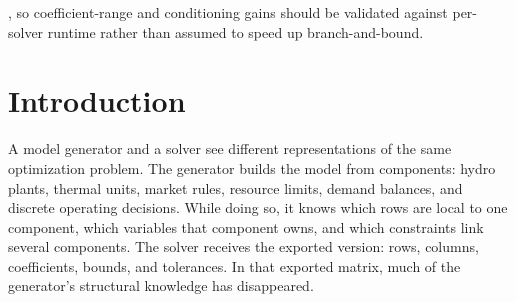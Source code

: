 \documentclass[AMA,Times1COL]{WileyNJDv5} %
\providecommand{\DIFadd}[1]{{\protect\color{blue} \sf #1}} %
\providecommand{\DIFaddbegin}{} %
\providecommand{\DIFaddend}{} %
\providecommand{\DIFdelend}{} %
\begin{document}
\begin{itemize}
\DIFdelend \DIFaddbegin \DIFadd{, so coefficient-range and conditioning gains
  should be validated against per-solver runtime rather than assumed to speed up branch-and-bound.
}\end{itemize}
\DIFaddend 


\section{Introduction}
\label{sec:introduction}

A model generator and a solver see different representations of the same optimization problem. The generator builds the model from components: hydro plants, thermal units, market rules, resource limits, demand balances, and discrete operating decisions. While doing so, it knows which rows are local to one component, which variables that component owns, and which constraints link several components. The solver receives the exported version: rows, columns, coefficients, bounds, and tolerances. In that exported matrix, much of the generator's structural knowledge has disappeared.
\end{document}
